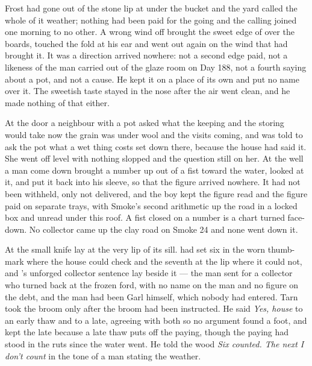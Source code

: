 Frost had gone out of the stone lip at  under the bucket and the yard called the whole of it weather; nothing had been paid for the going and the calling joined one morning to no other. A wrong wind off  brought the sweet edge of  over the boards, touched the fold at his ear and went out again on the wind that had brought it. It was a direction arrived nowhere: not a second edge paid, not a likeness of the man carried out of the glaze room on Day 188, not a fourth saying about a pot, and not a cause. He kept it on a place of its own and put no name over it. The sweetish taste stayed in the nose after the air went clean, and he made nothing of that either.

At the door a neighbour with a pot asked what the keeping and the storing would take now the grain was under wool and the visits coming, and was told to ask the pot what a wet thing costs set down there, because the house had said it. She went off level with nothing slopped and the question still on her. At the well a man come down  brought a number up out of a fist toward the water, looked at it, and put it back into his sleeve, so that the figure arrived nowhere. It had not been withheld, only not delivered, and the boy kept the figure read and the figure paid on separate trays, with Smoke's second arithmetic up the road in a locked box and unread under this roof. A fist closed on a number is a chart turned face-down. No collector came up the clay road on Smoke 24 and none went down it.

\scenebreak

At  the small knife lay at the very lip of its sill.  had set six in the worn thumb-mark where the house could check and the seventh at the lip where it could not, and 's unforged collector sentence lay beside it --- the man sent for a collector who turned back at the frozen ford, with no name on the man and no figure on the debt, and the man had been Garl himself, which nobody had entered. Tarn took the broom only after the broom had been instructed. He said \emph{Yes, house} to an early thaw and to a late, agreeing with both so no argument found a foot, and kept the late because a late thaw puts off the paying, though the paying had stood in the ruts since the water went. He told the wood \emph{Six counted. The next I don't count} in the tone of a man stating the weather.

